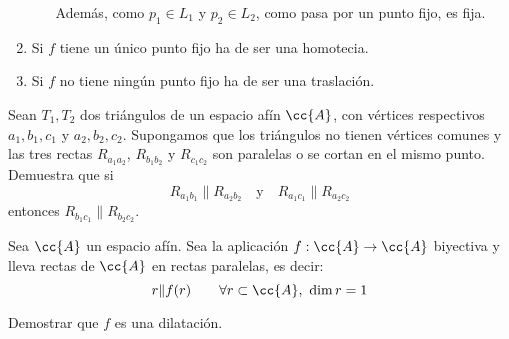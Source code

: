 \begin{ejercicio}
\begin{enumerate}
\begin{enumerate}
            Además, como $p_1\in L_1$ y $p_2\in L_2$, como pasa por un punto fijo, es fija.
        \end{enumerate}
        
        \item Si $f$ tiene un único punto fijo ha de ser una homotecia.
        \item Si $f$ no tiene ningún punto fijo ha de ser una traslación.
    \end{enumerate}
\end{ejercicio}

\begin{ejercicio}
    Sean $T_1, T_2$ dos triángulos de un espacio afín $\cc{A}$, con vértices respectivos $a_1, b_1, c_1$ y $a_2, b_2, c_2$. Supongamos que los triángulos no tienen vértices comunes y las tres rectas $R_{a_1a_2}$, $R_{b_1b_2}$ y $R_{c_1c_2}$ son paralelas o se cortan en el mismo punto. Demuestra que si
    \begin{equation*}
        R_{a_1b_1} \| R_{a_2b_2}
        \quad \text{y} \quad
        R_{a_1c_1} \| R_{a_2c_2}
    \end{equation*}
    entonces $R_{b_1c_1} \| R_{b_2c_2}$.
\end{ejercicio}

\begin{ejercicio}
    Sea $\cc{A}$ un espacio afín. Sea la aplicación $f:\cc{A}\to \cc{A}$ biyectiva y lleva rectas de $\cc{A}$ en rectas paralelas, es decir:
    \begin{equation*}
        r\|f(r) \qquad \forall r\subset \cc{A},~ \dim r =1
    \end{equation*}

    Demostrar que $f$ es una dilatación.
\end{ejercicio}